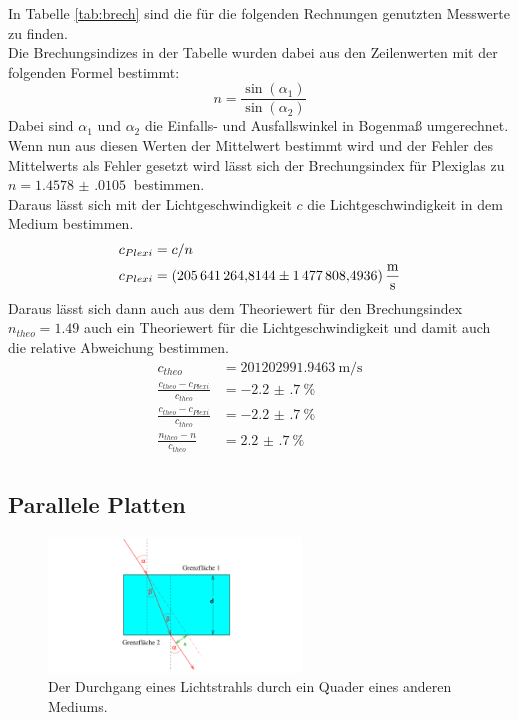 \noindent In Tabelle \ref{tab:brech} sind die für die folgenden Rechnungen genutzten Messwerte zu finden.\\
Die Brechungsindizes in der Tabelle wurden dabei aus den Zeilenwerten mit der folgenden Formel bestimmt:
\begin{equation*}
    n=\frac{\sin(\alpha_1)}{\sin(\alpha_2)}
\end{equation*}
Dabei sind $\alpha_1$ und $\alpha_2$ die Einfalls- und Ausfallswinkel in Bogenmaß umgerechnet.
Wenn nun aus diesen Werten der Mittelwert bestimmt wird und der Fehler des Mittelwerts als Fehler gesetzt 
wird lässt sich der Brechungsindex für Plexiglas zu $n= \SI{1.4578(0105)}{}$ bestimmen.\\
Daraus lässt sich mit der Lichtgeschwindigkeit $c$\cite{c} die Lichtgeschwindigkeit in dem Medium bestimmen.
\begin{align*}
    c_{Plexi}&=c/n \\
    c_{Plexi}&= \SI{205641264.8144 (14778084936)}{\metre\per\second}
\end{align*}
Daraus lässt sich dann auch aus dem Theoriewert für den Brechungsindex $n_{theo}=1.49$\cite{n} auch ein Theoriewert für die Lichtgeschwindigkeit und damit auch die relative Abweichung bestimmen.
\begin{align*}
    c_{theo}&=\SI{201202991.9463}{\metre\per\second}\\
    \frac{c_{theo}-c_{Plexi}}{c_{theo}}&=\SI{-2.2(7)}{\percent}\\
    \frac{c_{theo}-c_{Plexi}}{c_{theo}}&=\SI{-2.2(7)}{\percent}\\
    \frac{n_{theo}-n}{c_{theo}}&=\SI{2.2(7)}{\percent}\\
\end{align*}

\subsection{Parallele Platten}

\begin{figure}[h]
    \centering
    \includegraphics[width=0.6\textwidth]{latex/images/Platten.PNG}
    \caption{Der Durchgang eines Lichtstrahls durch ein Quader eines anderen Mediums.}
    \label{img:platt}
\end{figure}

